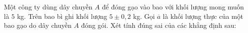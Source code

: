 \begin{ex}
Một công ty dùng dây chuyền $A$ để đóng gạo vào bao với khối lượng mong muốn là $5$ kg. Trên bao bì ghi khối lượng $5\pm0{,}2$ kg. Gọi $\overline a$ là khối lượng thực của một bao gạo do dây chuyền $A$ đóng gói. Xét tính đúng sai của các khẳng định sau:
\end{ex}
